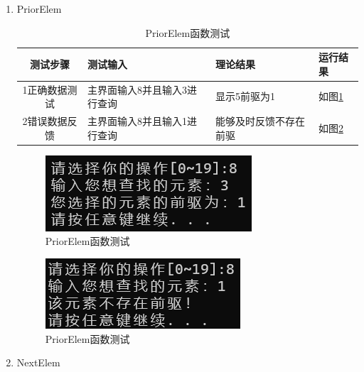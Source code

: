 \documentclass[supercite]{Experimental_Report}
\theoremstyle{definition}
\begin{document}
\begin{enumerate}
	
	\item PriorElem
	
	\begin{table}[h!]
		\begin{center}
			\caption{PriorElem函数测试}
			\begin{tabular}{|c|p{4cm}<{\centering}|p{4cm}<{\centering}|p{4cm}<{\centering}|} 
				\hline
				\textbf{测试步骤} & \textbf{测试输入} & \textbf{理论结果} & \textbf{运行结果} \\
				\hline
				1正确数据测试 & 主界面输入8并且输入3进行查询 & 显示5前驱为1 & 如图\ref{fig1-7-1}\\
				\hline
				2错误数据反馈 & 主界面输入8并且输入1进行查询 & 能够及时反馈不存在前驱 & 如图\ref{fig1-7-2}\\
				\hline
			\end{tabular}
		\end{center}
	\end{table}
	
	
	\begin{figure}[H] %
		\begin{center}
			\includegraphics[width=0.5\linewidth]{images/linklist/8-1.png}
			\caption{PriorElem函数测试}
			\label{fig1-7-1}
		\end{center}
	\end{figure}
	
	\begin{figure}[H] %
		\begin{center}
			\includegraphics[width=0.5\linewidth]{images/linklist/8-2.png}
			\caption{PriorElem函数测试}
			\label{fig1-7-2}
		\end{center}
	\end{figure}
	
	\item NextElem
	

\end{enumerate}
\end{document}

